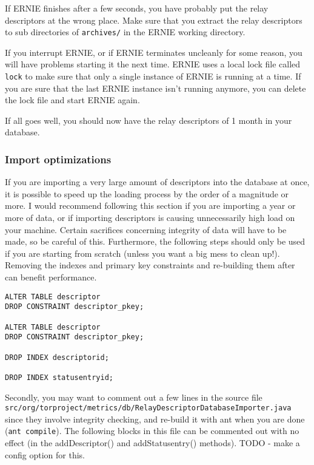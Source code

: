 \documentclass{article}
\begin{document}
If ERNIE finishes after a few seconds, you have probably put the relay
descriptors at the wrong place.
Make sure that you extract the relay descriptors to sub directories of
\verb+archives/+ in the ERNIE working directory.

If you interrupt ERNIE, or if ERNIE terminates uncleanly for some reason,
you will have problems starting it the next time.
ERNIE uses a local lock file called \verb+lock+ to make sure that only a
single instance of ERNIE is running at a time.
If you are sure that the last ERNIE instance isn't running anymore, you
can delete the lock file and start ERNIE again.

If all goes well, you should now have the relay descriptors of 1 month in
your database.

\subsubsection{Import optimizations}
If you are importing a very large amount of descriptors into the database at
once, it is possible to speed up the loading process by the order of a magnitude
or more. I would recommend following this section if you are importing a year or
more of data, or if importing descriptors is causing unnecessarily high load on
your machine. Certain sacrifices concerning integrity of data will have to be
made, so be careful of this. Furthermore, the following steps should only be
used if you are starting from scratch (unless you want a big mess to clean up!).
\\

Removing the indexes and primary key constraints and re-building them after
can benefit performance.

\begin{verbatim}
ALTER TABLE descriptor
DROP CONSTRAINT descriptor_pkey;

ALTER TABLE descriptor
DROP CONSTRAINT descriptor_pkey;

DROP INDEX descriptorid;

DROP INDEX statusentryid;
\end{verbatim}

Secondly, you may want to comment out a few lines in the source file
\verb+src/org/torproject/metrics/db/RelayDescriptorDatabaseImporter.java+ since
they involve integrity checking, and re-build it with ant when you are done
(\verb+ant compile+). The following blocks in this file can be commented out
with no effect (in the addDescriptor() and addStatusentry() methods).  TODO -
make a config option for this.
\end{document}
